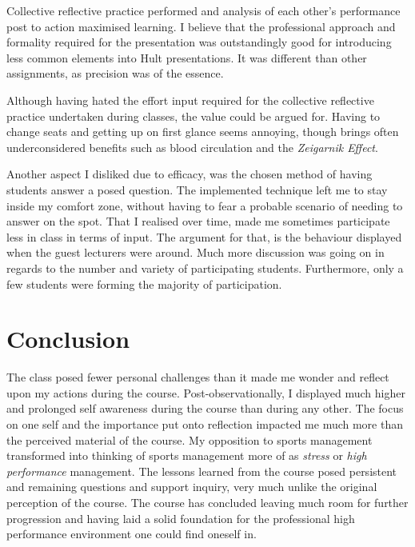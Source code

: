 \documentclass[12pt]{article}
\begin{document}
Collective reflective practice performed and analysis of each other's
performance post to action maximised learning. I believe that the professional
approach and formality required for the presentation was outstandingly good for
introducing less common elements into Hult presentations. It was different than
other assignments, as precision was of the essence.


Although having hated the effort input required for the collective reflective
practice undertaken during classes, the value could be argued for. Having to
change seats and getting up on first glance seems annoying, though brings often
underconsidered benefits such as blood circulation and the \textit{Zeigarnik
Effect}.

Another aspect I disliked due to efficacy, was the chosen method of having
students answer a posed question. The implemented technique left me to stay
inside my comfort zone, without having to fear a probable scenario of needing to
answer on the spot. That I realised over time, made me sometimes participate
less in class in terms of input. The argument for that, is the behaviour
displayed when the guest lecturers were around. Much more discussion was going
on in regards to the number and variety of participating students. Furthermore,
only a few students were forming the majority of participation. 


\section{Conclusion}
The class posed fewer personal challenges than it made me wonder and reflect
upon my actions during the course. Post-observationally, I displayed much higher
and prolonged self awareness during the course than during any other. The focus
on one self and the importance put onto reflection impacted me much more than
the perceived material of the course. My opposition to sports management
transformed into thinking of sports management more of as \textit{stress} or
\textit{high performance} management. The lessons learned from the course posed
persistent and remaining questions and support inquiry, very much unlike the
original perception of the course. 
The course has concluded leaving much room for further progression and having
laid a solid foundation for the professional high performance environment one
could find oneself in.

\pagebreak
\end{document}
